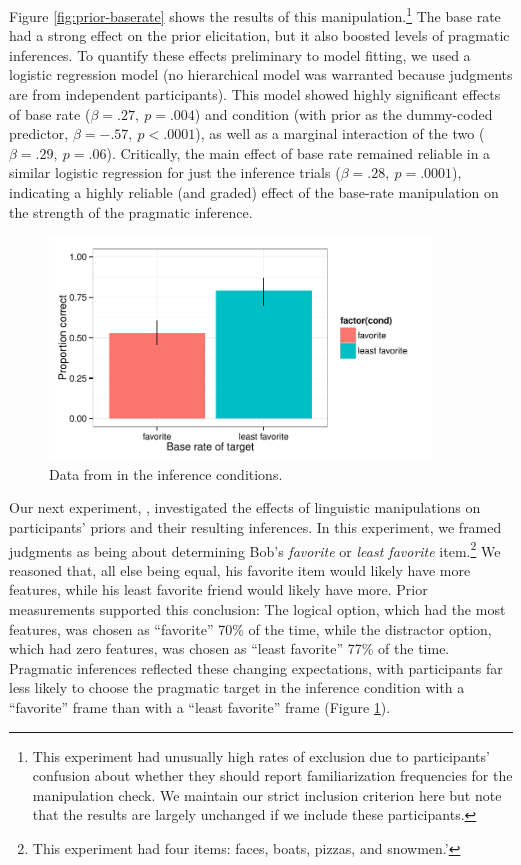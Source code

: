 Figure \ref{fig:prior-baserate} shows the results of this manipulation.\footnote{This experiment had unusually high rates of exclusion due to participants' confusion about whether they should report  familiarization frequencies for the manipulation check. We maintain our strict inclusion criterion here but note that the results are largely unchanged if we include these participants.}  The base rate had a strong effect on the prior elicitation, but it also boosted levels of pragmatic inferences. To quantify these effects preliminary to model fitting, we used a logistic regression model (no hierarchical model was warranted because judgments are from independent participants). This model showed highly significant effects of base rate ($\beta = .27,~p = .004$) and condition  (with prior as the dummy-coded predictor, $\beta = -.57,~p < .0001$), as well as a marginal interaction of the two  ($\beta = .29,~p = .06$). Critically, the main effect of base rate remained reliable in a similar logistic regression for just the inference trials ($\beta = .28,~p = .0001$), indicating a highly reliable (and graded) effect of the base-rate manipulation on the strength of the pragmatic inference.


\begin{figure}[t]
  \centering
  \includegraphics[width=4in]{../plots/2-prior-valence.pdf}
  \caption{\label{fig:prior-valence} Data from  in the inference conditions.}
\end{figure}

Our next experiment, , investigated the effects of linguistic manipulations on participants' priors and their resulting inferences. In this experiment, we framed judgments as being about determining Bob's \emph{favorite} or \emph{least favorite} item.\footnote{This experiment had four items: faces, boats, pizzas, and snowmen.'} We reasoned that, all else being equal, his favorite item would likely have more features, while his least favorite friend would likely have more. Prior measurements supported this conclusion: The logical option, which had the most features, was chosen as ``favorite'' 70\% of the time, while the distractor option, which had zero features, was chosen as ``least favorite'' 77\% of the time. Pragmatic inferences reflected these changing expectations, with participants far less likely to choose the pragmatic target in the inference condition with a ``favorite'' frame than with a ``least favorite'' frame (Figure \ref{fig:prior-valence}).  


